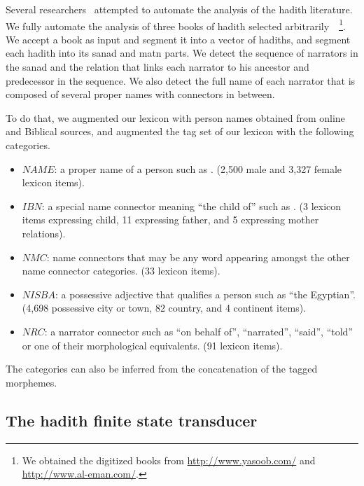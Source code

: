 \documentclass{llncs}
\begin{document}
Several researchers~\cite{iTree,Hadithopaedia:08} attempted to automate 
the analysis of the hadith literature. 
We fully automate the analysis of three books of hadith selected 
arbitrarily~\cite{IbnHanbal,AlKulayni,AlTousi}~\footnote{We obtained
  the digitized books from 
  \href{http://www.yasoob.com/}{http://www.yasoob.com/} and 
  \href{http://www.al-eman.com/}{http://www.al-eman.com/}. }.
We accept a book as input
and segment it into a vector of hadiths,
and segment each hadith into its sanad and matn parts. 
We detect the sequence of narrators in the sanad and 
the relation that links each narrator to his ancestor and 
predecessor in the sequence. 
We also detect the full name of each narrator that is
composed of several proper names with connectors
in between. 


                     

To do that, we augmented our lexicon with person names obtained from online and Biblical sources,
and augmented the tag set of our lexicon with the following categories.
\begin{itemize}
\item $\mathit{NAME}$: a proper name of a person such as . (2,500 male and 3,327 female lexicon items). 
\item $\mathit{IBN}$: a special name connector meaning ``the child of'' such as . (3 lexicon items expressing child,
11 expressing father, and 5 expressing mother relations).
\item $\mathit{NMC}$: name connectors that may be any word appearing amongst the other name connector categories. (33 lexicon items).
\item $\mathit{NISBA}$: a possessive adjective that qualifies a person such as  ``the Egyptian''. (4,698 possessive city or town, 82 country, and 4 continent items). 
\item $\mathit{NRC}$: a narrator connector such as
 ``on behalf of'',  ``narrated'',  ``said'',  ``told'' or one of their morphological equivalents. (91 lexicon items).
\end{itemize}
The categories can also be inferred from the concatenation of the tagged morphemes.


\subsection{The hadith finite state transducer}
\label{sec:FST}
\end{document}
